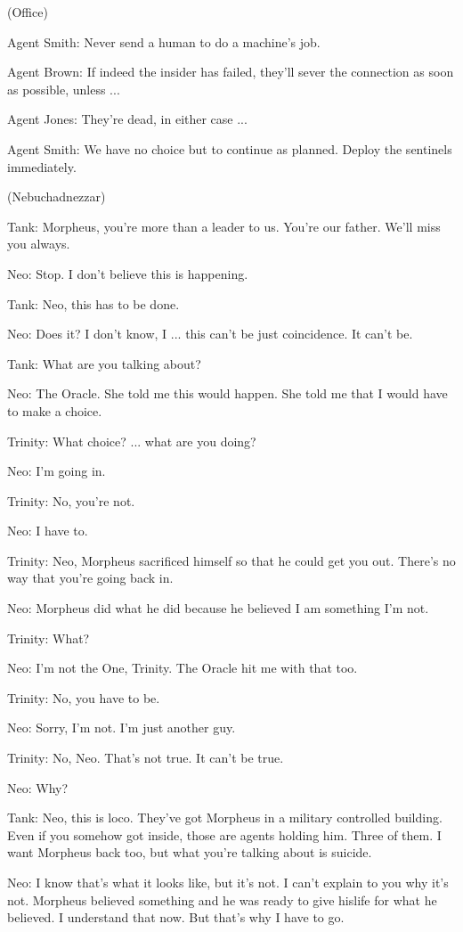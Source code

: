 \documentclass[UTF8]{ctexart}
\newenvironment{myquote}{\color{green} \setlength{\leftskip}{6em} \setlength{\rightskip}{4em} \setlength{\parindent}{-2em}}{\par}
\begin{document}
\begin{myquote}
(Office)

Agent Smith: Never send a human to do a machine's job.

Agent Brown: If indeed the insider has failed, they'll sever the connection as soon as possible, unless ...

Agent Jones: They're dead, in either case ...

Agent Smith: We have no choice but to continue as planned. Deploy the sentinels immediately.

(Nebuchadnezzar)

Tank: Morpheus, you're more than a leader to us. You're our father. We'll miss you always.

Neo: Stop. I don't believe this is happening.

Tank: Neo, this has to be done.

Neo: Does it? I don't know, I ... this can't be just coincidence. It can't be.

Tank: What are you talking about?

Neo: The Oracle. She told me this would happen. She told me that I would have to make a choice.

Trinity: What choice? ... what are you doing?

Neo: I'm going in.

Trinity: No, you're not.

Neo: I have to.

Trinity: Neo, Morpheus sacrificed himself so that he could get you out. There's no way that you're going back in.

Neo: Morpheus did what he did because he believed I am something I'm not.

Trinity: What?

Neo: I'm not the One, Trinity. The Oracle hit me with that too.

Trinity: No, you have to be.

Neo: Sorry, I'm not. I'm just another guy.

Trinity: No, Neo. That's not true. It can't be true.

Neo: Why?

Tank: Neo, this is loco. They've got Morpheus in a military controlled building. Even if you somehow got inside, those are agents holding him. Three of them. I want Morpheus back too, but what you're talking about is suicide.

Neo: I know that's what it looks like, but it's not. I can't explain to you why it's not. Morpheus believed something and he was ready to give hislife for what he believed. I understand that now. But that's why I have to go.


\end{myquote}
\end{document}
